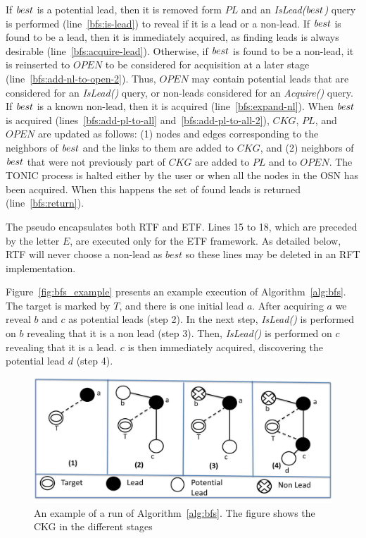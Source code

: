 \documentclass[journal]{IEEEtran}
\newcommand{\islead}[1]{{\em IsLead(#1)}}
\newcommand{\acquire}[1]{{\em Acquire(#1)}}
\newcommand{\best}{{\textit best}}
\begin{document}
If $\best$ is a potential lead, then 
it is removed form $PL$ and an \islead{$\best$} query is performed (line~\ref{bfs:is-lead}) to reveal if it is a lead or a non-lead. 
If $\best$ is found to be a lead, then it is immediately acquired, as finding leads is always desirable (line~\ref{bfs:acquire-lead}). 
Otherwise, if $\best$ is found to be a non-lead, it is reinserted to $OPEN$ to be considered for acquisition at a later stage (line~\ref{bfs:add-nl-to-open-2}).
Thus, $OPEN$ may contain potential leads that are considered for an \islead{} query, or non-leads considered for an \acquire{} query. 
If $\best$ is a known non-lead, then it is acquired (line~\ref{bfs:expand-nl}). 
When $\best$ is acquired (lines~\ref{bfs:add-pl-to-all} and~\ref{bfs:add-pl-to-all-2}), $CKG$, $PL$, and $OPEN$ are updated as follows: (1) nodes and edges corresponding to the neighbors of $\best$ and the links to them are added to $CKG$, and (2) neighbors of $\best$ that were not previously part of $CKG$ are added to $PL$ and to $OPEN$. 
The TONIC process is halted either by the user  or when all the nodes in the OSN has been acquired. When this happens the set of found leads is returned (line~\ref{bfs:return}). 


The pseudo encapsulates both RTF and ETF. Lines 15 to 18, which are preceded by the letter $E$, are executed only for the ETF framework. As detailed below, RTF will never choose a non-lead as $best$ so these lines may be deleted in an RFT implementation.




Figure~\ref{fig:bfs_example} presents an example execution of Algorithm~\ref{alg:bfs}.
The target is marked by $T$, and there is one initial lead $a$. %
After acquiring $a$ we reveal $b$ and $c$ as potential leads (step 2).
In the next step, \islead{} is performed on $b$ revealing that it is a non lead (step 3).
Then, \islead{} is performed on $c$ revealing that it is a lead. $c$ is then immediately acquired,  discovering the potential lead $d$ (step 4).




\begin{figure}[t!]
  \centering
	 \includegraphics[width=\linewidth]{btf-process-and-legend-new.jpg}
  \caption{An example of a run of Algorithm~\ref{alg:bfs}. The figure shows the CKG in the different stages}
	\label{fig:bfs_example}\label{fig:basic_fifo}
\end{figure}
\end{document}

